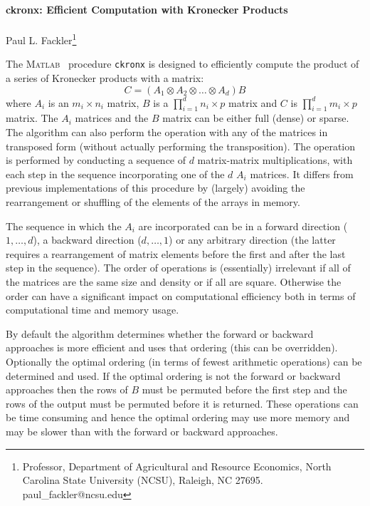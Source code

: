 \documentclass[12pt,fleqn]{article}
\def\matlab{\textsc{Matlab}}   %
\begin{document}
\thispagestyle{empty} \pagestyle{empty}


{{\noindent \large {\bf ckronx: Efficient Computation with Kronecker Products}}\\
~\\
\renewcommand{\thefootnote}{\fnsymbol{footnote}}
{Paul L. Fackler\footnote{Professor, Department of Agricultural and Resource Economics, North Carolina State
University (NCSU), Raleigh, NC 27695. paul\_fackler@ncsu.edu}}}\\


\renewcommand{\thefootnote}{\arabic{footnote}}
\setcounter{footnote}{0}


\renewcommand{\baselinestretch}{1}\small\normalsize

The \matlab~  procedure {\tt ckronx} is designed to efficiently compute the product of a series of Kronecker products with a matrix:
\[C=\left(A_1\otimes A_2\otimes \ldots \otimes A_d\right)B\]
where $A_i$ is an $m_i\times n_i$ matrix, $B$ is a $\prod_{i=1}^d n_i \times p$ matrix and $C$ is  $\prod_{i=1}^d m_i \times p$ matrix. The $A_i$ matrices and the $B$ matrix can be either full (dense) or sparse. The algorithm can also perform the operation with any of the matrices in transposed form (without actually performing the transposition). The operation is performed by conducting a sequence of $d$ matrix-matrix multiplications, with each step in the sequence incorporating one of the $d$ $A_i$ matrices. It differs from previous implementations of this procedure by (largely) avoiding the rearrangement or shuffling of the elements of the arrays in memory.

The sequence in which the $A_i$ are incorporated can be in a forward direction ($1,\dots,d$), a backward direction ($d,\ldots,1$) or any arbitrary direction (the latter requires a rearrangement of matrix elements before the first and after the last step in the sequence). The order of operations is (essentially) irrelevant if all of the matrices are the same size and density or if all are square. Otherwise the order can have a significant impact on computational efficiency both in terms of computational time and memory usage.

By default the algorithm determines whether the forward or backward approaches is more efficient and uses that ordering (this can be overridden). Optionally the optimal ordering (in terms of fewest arithmetic operations) can  be determined and used. If the optimal ordering is not the forward or backward approaches then the rows of $B$ must be permuted before the first step and the rows of the output must be permuted before it is returned. These operations can be time consuming and hence the optimal ordering may use more memory and may be slower than with the forward or backward approaches.
\end{document}
